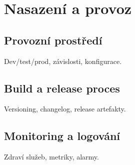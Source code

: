 \chapter{Nasazení a provoz}
\label{chap:nasazeni}

\section{Provozní prostředí}
Dev/test/prod, závislosti, konfigurace.

\section{Build a release proces}
Versioning, changelog, release artefakty.

\section{Monitoring a logování}
Zdraví služeb, metriky, alarmy.
